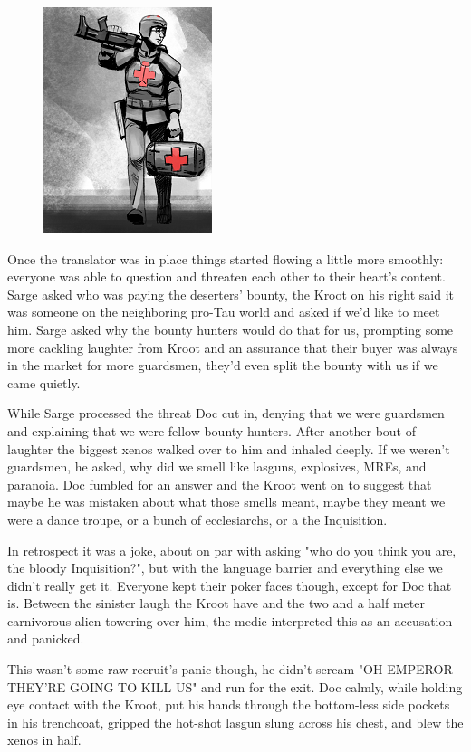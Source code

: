 \begin{figure}
	\begin{center}
		\includegraphics[width=\figwidth]{pics/10/26.png}
	\end{center}
\end{figure}
Once the translator was in place things started flowing a little more smoothly: 
everyone was able to question and threaten each other to their heart's content. 
Sarge asked who was paying the deserters' bounty, the Kroot on his right said it was someone on the neighboring pro-Tau world and asked if we'd like to meet him. 
Sarge asked why the bounty hunters would do that for us, prompting some more cackling laughter from Kroot and an assurance that their buyer was always in the market for more guardsmen, they'd even split the bounty with us if we came quietly.

While Sarge processed the threat Doc cut in, denying that we were guardsmen and explaining that we were fellow bounty hunters. 
After another bout of laughter the biggest xenos walked over to him and inhaled deeply. 
If we weren't guardsmen, he asked, why did we smell like lasguns, explosives, MREs, and paranoia. 
Doc fumbled for an answer and the Kroot went on to suggest that maybe he was mistaken about what those smells meant, maybe they meant we were a dance troupe, or a bunch of ecclesiarchs, or a the Inquisition.

In retrospect it was a joke, about on par with asking "who do you think you are, the bloody Inquisition?", but with the language barrier and everything else we didn't really get it. 
Everyone kept their poker faces though, except for Doc that is. 
Between the sinister laugh the Kroot have and the two and a half meter carnivorous alien towering over him, the medic interpreted this as an accusation and panicked.

This wasn't some raw recruit's panic though, he didn't scream "OH EMPEROR THEY'RE GOING TO KILL US" and run for the exit. 
Doc calmly, while holding eye contact with the Kroot, put his hands through the bottom-less side pockets in his trenchcoat, gripped the hot-shot lasgun slung across his chest, and blew the xenos in half.

